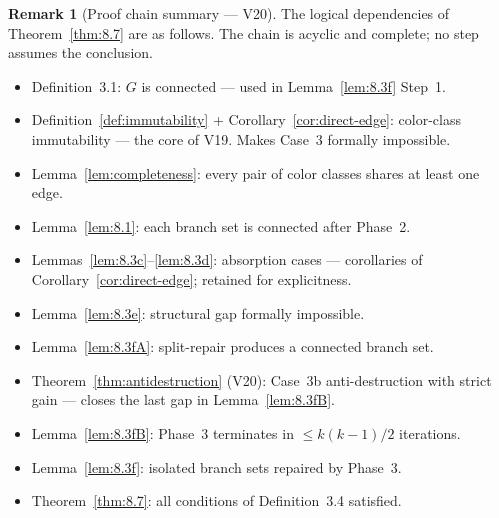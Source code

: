 \documentclass[12pt,a4paper]{article}
\theoremstyle{definition}
\newtheorem{remark}[theorem]{Remark}
\begin{document}
\begin{remark}[Proof chain summary --- V20]
The logical dependencies of Theorem~\ref{thm:8.7} are as follows.
The chain is acyclic and complete; no step assumes the conclusion.
\begin{itemize}[noitemsep]
\item Definition~3.1: $G$ is connected --- used in Lemma~\ref{lem:8.3f}
  Step~1.
\item Definition~\ref{def:immutability} + Corollary~\ref{cor:direct-edge}:
  color-class immutability --- the core of V19. Makes Case~3 formally
  impossible.
\item Lemma~\ref{lem:completeness}: every pair of color classes shares
  at least one edge.
\item Lemma~\ref{lem:8.1}: each branch set is connected after Phase~2.
\item Lemmas~\ref{lem:8.3c}--\ref{lem:8.3d}: absorption cases ---
  corollaries of Corollary~\ref{cor:direct-edge}; retained for
  explicitness.
\item Lemma~\ref{lem:8.3e}: structural gap formally impossible.
\item Lemma~\ref{lem:8.3fA}: split-repair produces a connected branch set.
\item Theorem~\ref{thm:antidestruction} (V20): Case~3b anti-destruction
  with strict gain --- closes the last gap in Lemma~\ref{lem:8.3fB}.
\item Lemma~\ref{lem:8.3fB}: Phase~3 terminates in $\leq k(k-1)/2$
  iterations.
\item Lemma~\ref{lem:8.3f}: isolated branch sets repaired by Phase~3.
\item Theorem~\ref{thm:8.7}: all conditions of Definition~3.4 satisfied.
\end{itemize}
\end{remark}
\end{document}
